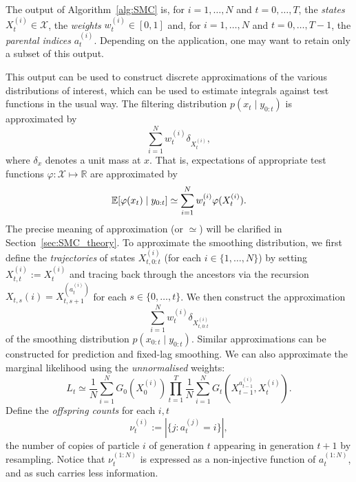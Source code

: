 The output of Algorithm~\ref{alg:SMC} is, for $i=1,\dots, N$ and $t=0,\dots,T$, the \emph{states} $X_t^{(i)} \in \mathcal{X}$, the \emph{weights} $w_t^{(i)} \in [0,1]$ and, for $i=1,\dots, N$ and $t=0,\dots,T-1$, the \emph{parental indices} $a_t^{(i)}$.
Depending on the application, one may want to retain only a subset of this output.

This output can be used to construct discrete approximations of the various distributions of interest, which can be used to estimate integrals against test functions in the usual way.
The filtering distribution $p(x_t \mid y_{0:t})$ is approximated by
\begin{equation*}
\sum_{i=1}^N w_t^{(i)} \delta_{ X_t^{(i)} } ,
\end{equation*}
where $\delta_x$ denotes a unit mass at $x$.
That is, expectations of appropriate test functions $\varphi : \mathcal{X} \mapsto \mathbb{R}$ are approximated by
\begin{equation*}
\mathbb{E}[ \varphi(x_t) \mid y_{0:t} ]
\simeq \sum_{i=1}^N w_t^{(i)} \varphi( X_t^{(i)} ) .
\end{equation*}
The precise meaning of approximation (or $\simeq$) will be clarified in Section~\ref{sec:SMC_theory}.
To approximate the smoothing distribution, we first define the \emph{trajectories} of states $X_{t,0:t}^{(i)}$ (for each $i \in \{1,\dots,N\}$) by setting $X_{t,t}^{(i)} := X_t^{(i)}$ and tracing back through the ancestors via the recursion $X_{t,s}{(i)} = X_{t,s+1}^{( a_t^{(i)} )}$ for each $s \in \{0,\dots, t\}$. 
We then construct the approximation
\begin{equation*}
\sum_{i=1}^N w_t^{(i)} \delta_{ X_{t,0:t}^{(i)} } 
\end{equation*}
of the smoothing distribution $p(x_{0:t} \mid y_{0:t})$.
Similar approximations can be constructed for prediction and fixed-lag smoothing.
We can also approximate the marginal likelihood using the \emph{unnormalised} weights:
\begin{equation}\label{eq:likelihood_estimate}
L_t 
\simeq \frac{1}{N} \sum_{i=1}^N G_0(X_0^{(i)}) \prod_{t=1}^T \frac{1}{N}
        \sum_{i=1}^N G_t( X_{t-1}^{ a_{t-1}^{(i)} }, X_t^{(i)} ) .
\end{equation}
Define the \emph{offspring counts} for each $i,t$
\begin{equation*}
\nu_t^{(i)} := |\{ j: a_t^{(j)} = i \}| ,
\end{equation*}
the number of copies of particle $i$ of generation $t$ appearing in generation $t+1$ by resampling.
Notice that $\nu_t^{(1:N)}$ is expressed as a non-injective function of $a_t^{(1:N)}$, and as such carries less information.


